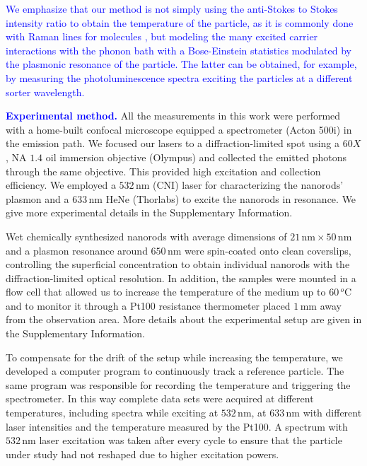 \documentclass[journal=nalefd,manuscript=letter]{achemso}
\newcommand{\HI}[1]{\textcolor{blue}{#1}} %
\newcommand{\nm}{\ensuremath{\,\textrm{nm}}}
\newcommand{\mm}{\ensuremath{\,\textrm{mm}}}
\newcommand{\degree}{\ensuremath{\,^o\textrm{C}}}
\begin{document}
\HI{We emphasize that our method is not simply using the anti-Stokes to Stokes intensity ratio to 
obtain the temperature of the particle, as it is commonly done with Raman lines for molecules 
\cite{krishnan1928influence,zondervan2006single}, but modeling the many excited carrier interactions
with the phonon bath with a Bose-Einstein statistics modulated by the plasmonic resonance of the particle. 
The latter can be obtained, for example, by measuring the photoluminescence spectra exciting the particles
at a different sorter wavelength.}

\HI{\textbf{Experimental method.}} All the measurements in this work were performed with a home-built confocal
microscope equipped a spectrometer (Acton 500i) in the emission path.  We focused
our lasers to a diffraction-limited spot using a $60X$, NA $1.4$ oil immersion
objective (Olympus) and collected the emitted photons through the same
objective. This provided high excitation and collection efficiency.
We employed a $532\nm$ (CNI) laser for characterizing the nanorods' plasmon and
a $633\nm$ HeNe (Thorlabs) to excite the nanorods in resonance.
We give more experimental details in the Supplementary Information.

Wet chemically synthesized nanorods\cite{Nikoobakht2003} with average dimensions
of $21\nm\times50\nm$ and a plasmon resonance around $650\nm$ were spin-coated
onto clean coverslips, controlling the superficial concentration to obtain
individual nanorods with the diffraction-limited optical resolution.
In addition, the samples were mounted in a flow cell that allowed us to increase
the temperature of the medium up to $60\degree$ and to monitor it through a
Pt100 resistance thermometer placed $1\mm$ away from the observation area. More
details about the experimental setup are given in the Supplementary Information.

To compensate for the drift of the setup while increasing the temperature, we
developed a computer program to continuously track a reference particle. The
same program was responsible for recording the temperature and triggering the
spectrometer. In this way complete data sets were acquired at different
temperatures, including spectra while exciting at $532\nm$, at $633\nm$ with
different laser intensities and the temperature measured by the Pt100. A
spectrum with $532\nm$ laser excitation was taken after every cycle to ensure
that the particle under study had not reshaped due to higher excitation powers.
\end{document}
